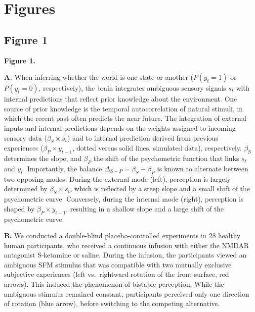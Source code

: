 \documentclass[
]{article}
\begin{document}
\newpage

\hypertarget{figures}{%
\section{Figures}\label{figures}}

\hypertarget{figure-1}{%
\subsection{Figure 1}\label{figure-1}}


\textbf{Figure 1.}

\textbf{A.} When inferring whether the world is one state or another
(\(P(y_t = 1)\) or \(P(y_t = 0)\), respectively), the brain integrates
ambiguous sensory signals \(s_t\) with internal predictions that reflect
prior knowledge about the environment. One source of prior knowledge is
the temporal autocorrelation of natural stimuli, in which the recent
past often predicts the near future. The integration of external inputs
and internal predictions depends on the weights assigned to incoming
sensory data (\(\beta_S \times s_t\)) and to internal prediction derived
from previous experiences (\(\beta_P \times y_{t-1}\), dotted versus
solid lines, simulated data), respectively. \(\beta_S\) determines the
slope, and \(\beta_P\) the shift of the psychometric function that links
\(s_t\) and \(y_t\). Importantly, the balance
\(\Delta_{S-P} = \beta_S - \beta_P\) is known to alternate between two
opposing modes: During the external mode (left), perception is largely
determined by \(\beta_S \times s_t\), which is reflected by a steep
slope and a small shift of the psychometric curve. Conversely, during
the internal mode (right), perception is shaped by
\(\beta_P \times y_{t-1}\), resulting in a shallow slope and a large
shift of the psychometric curve.

\textbf{B.} We conducted a double-blind placebo-controlled experiments
in 28 healthy human participants, who received a continuous infusion
with either the NMDAR antagonist S-ketamine or saline. During the
infusion, the participants viewed an ambiguous SFM stimulus that was
compatible with two mutually exclusive subjective experiences (left
vs.~rightward rotation of the front surface, red arrows). This induced
the phenomenon of bistable perception: While the ambiguous stimulus
remained constant, participants perceived only one direction of rotation
(blue arrow), before switching to the competing alternative.
\end{document}
